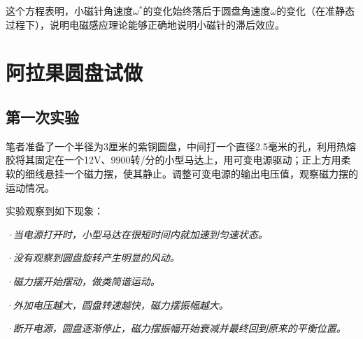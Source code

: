 \documentclass{CLGPY}
\begin{document}
\begin{multicols}{1}
这个方程表明，小磁针角速度$\omega^*$的变化始终落后于圆盘角速度$\omega$的变化（在准静态过程下），说明电磁感应理论能够正确地说明小磁针的滞后效应。

\section{阿拉果圆盘试做}
\subsection{第一次实验}
笔者准备了一个半径为3厘米的紫铜圆盘，中间打一个直径2.5毫米的孔，利用热熔胶将其固定在一个12V、9900转/分的小型马达上，用可变电源驱动；正上方用柔软的细线悬挂一个磁力摆，使其静止。调整可变电源的输出电压值，观察磁力摆的运动情况。

实验观察到如下现象：

\emph{·当电源打开时，小型马达在很短时间内就加速到匀速状态。}

\emph{·没有观察到圆盘旋转产生明显的风动。}

\emph{·磁力摆开始摆动，做类简谐运动。}

\emph{·外加电压越大，圆盘转速越快，磁力摆振幅越大。}

\emph{·断开电源，圆盘逐渐停止，磁力摆振幅开始衰减并最终回到原来的平衡位置。}



\end{multicols}
\end{document}
